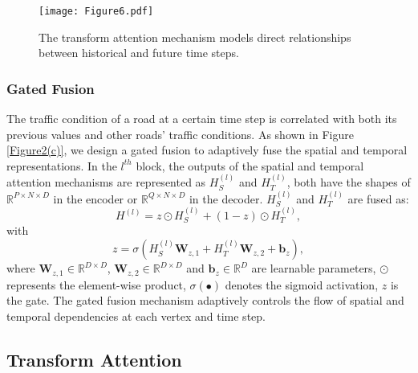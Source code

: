 \documentclass[letterpaper]{article} \usepackage{aaai20}  \usepackage{times}  \usepackage{helvet} \usepackage{courier}  \usepackage[hyphens]{url}  \usepackage{graphicx} \usepackage{amsmath}
\begin{document}
\begin{figure}
	\centering
	\texttt{[image: Figure6.pdf]} \\
	\caption{The transform attention mechanism models direct relationships between historical  and future time steps.}
	\label{Figure6}
\end{figure}

\subsubsection{Gated Fusion}

The traffic condition of a road at a certain time step is correlated with both its previous values and other roads' traffic conditions. As shown in Figure \ref{Figure2(c)}, we design a gated fusion to adaptively fuse the spatial and temporal representations. In the $ l^{th} $ block, the outputs of the spatial and temporal attention mechanisms are represented as $ H_S^{(l)} $ and $ H_T^{(l)} $, both have the shapes of $ \mathbb{R}^{P \times N \times D} $ in the encoder or $ \mathbb{R}^{Q \times N \times D} $ in the decoder. $ H_S^{(l)} $ and $ H_T^{(l)} $ are fused as:
\begin{equation}
H^{(l)} = z \odot H_S^{(l)} + (1-z) \odot H_T^{(l)},
\end{equation}
with
\begin{equation}
z = \sigma ( H_S^{(l)} \mathbf{W}_{z,1} + H_T^{(l)} \mathbf{W}_{z,2} + \mathbf{b}_z ),
\end{equation}
where $ \mathbf{W}_{z,1} \in \mathbb{R}^{D \times D} $, $ \mathbf{W}_{z,2} \in \mathbb{R}^{D \times D} $ and $ \mathbf{b}_{z} \in \mathbb{R}^{D} $ are learnable parameters, $ \odot $ represents the element-wise product, $ \sigma ( \bullet ) $ denotes the sigmoid activation, $ z $ is the gate. The gated fusion mechanism adaptively controls the flow of spatial and temporal dependencies at each vertex and time step.  

\subsection{Transform Attention}
\end{document}

